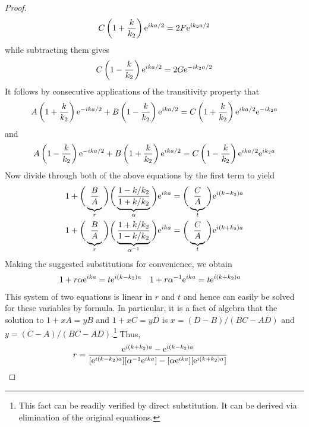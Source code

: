 \documentclass[../psets.tex]{subfiles}
\begin{document}
\begin{enumerate}
\begin{proof}
        \begin{equation*}
            C\left( 1+\frac{k}{k_2} \right)\e[ika/2] = 2F\e[ik_2a/2]
        \end{equation*}
        while subtracting them gives
        \begin{equation*}
            C\left( 1-\frac{k}{k_2} \right)\e[ika/2] = 2G\e[-ik_2a/2]
        \end{equation*}
        It follows by consecutive applications of the transitivity property that
        \begin{equation*}
            A\left( 1+\frac{k}{k_2} \right)\e[-ika/2]+B\left( 1-\frac{k}{k_2} \right)\e[ika/2] = C\left( 1+\frac{k}{k_2} \right)\e[ika/2]\e[-ik_2a]
        \end{equation*}
        and
        \begin{equation*}
            A\left( 1-\frac{k}{k_2} \right)\e[-ika/2]+B\left( 1+\frac{k}{k_2} \right)\e[ika/2] = C\left( 1-\frac{k}{k_2} \right)\e[ika/2]\e[ik_2a]
        \end{equation*}
        Now divide through both of the above equations by the first term to yield
        \begin{align*}
            1+\bigg( \underbrace{\frac{B\vphantom{/}}{A\vphantom{/}}}_r \bigg)\bigg( \underbrace{\frac{1-k/k_2}{1+k/k_2}}_\alpha \bigg)\e[ika] &= \bigg( \underbrace{\frac{C\vphantom{/}}{A\vphantom{/}}}_t \bigg)\e[i(k-k_2)a]\\
            1+\bigg( \underbrace{\frac{B\vphantom{/}}{A\vphantom{/}}}_r \bigg)\bigg( \underbrace{\frac{1+k/k_2}{1-k/k_2}}_{\alpha^{-1}} \bigg)\e[ika] &= \bigg( \underbrace{\frac{C\vphantom{/}}{A\vphantom{/}}}_t \bigg)\e[i(k+k_2)a]
        \end{align*}
        Making the suggested substitutions for convenience, we obtain
        \begin{align*}
            1+r\alpha\e[ika] &= t\e[i(k-k_2)a]&
            1+r\alpha^{-1}\e[ika] &= t\e[i(k+k_2)a]
        \end{align*}
        This system of two equations is linear in $r$ and $t$ and hence can easily be solved for these variables by formula. In particular, it is a fact of algebra that the solution to $1+xA=yB$ and $1+xC=yD$ is $x=(D-B)/(BC-AD)$ and $y=(C-A)/(BC-AD)$.\footnote{This fact can be readily verified by direct substitution. It can be derived via elimination of the original equations.} Thus,
        \begin{align*}
            r &= \frac{\e[i(k+k_2)a]-\e[i(k-k_2)a]}{[\e[i(k-k_2)a]][\alpha^{-1}\e[ika]]-[\alpha\e[ika]][\e[i(k+k_2)a]]}&

\end{align*}
\end{proof}
\end{enumerate}
\end{document}
